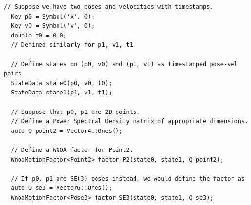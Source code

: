 \documentclass[border=1pt]{standalone}
\begin{document}
\begin{listingbox}
\begin{lstlisting}[style=C++Style]
  // Suppose we have two poses and velocities with timestamps.
  Key p0 = Symbol('x', 0);
  Key v0 = Symbol('v', 0);
  double t0 = 0.0;
  // Defined similarly for p1, v1, t1.
  
  // Define states on (p0, v0) and (p1, v1) as timestamped pose-vel pairs.
  StateData state0(p0, v0, t0);
  StateData state1(p1, v1, t1);
  
  // Suppose that p0, p1 are 2D points.
  // Define a Power Spectral Density matrix of appropriate dimensions.
  auto Q_point2 = Vector4::Ones();
  
  // Define a WNOA factor for Point2.
  WnoaMotionFactor<Point2> factor_P2(state0, state1, Q_point2);
  
  // If p0, p1 are SE(3) poses instead, we would define the factor as
  auto Q_se3 = Vector6::Ones();
  WnoaMotionFactor<Pose3> factor_SE3(state0, state1, Q_se3);
\end{lstlisting}
\end{listingbox}
\end{document}
